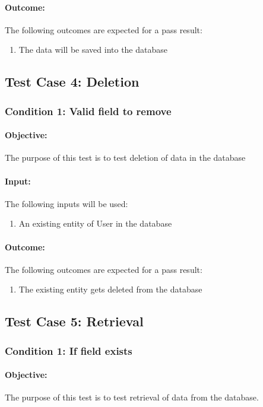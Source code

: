 \documentclass{article}
\begin{document}
\paragraph{Outcome:} The following outcomes are expected for a pass result:
\begin{enumerate}
	\item The data will be saved into the database
\end{enumerate}

\subsection{Test Case 4: Deletion}\label{test4}
\subsubsection{Condition 1: Valid field to remove }
\paragraph{Objective:} The purpose of this test is to test deletion of data in the database
\paragraph{Input:} The following inputs will be used:
\begin{enumerate}
	\item An existing entity of User in the database
\end{enumerate}
\paragraph{Outcome:} The following outcomes are expected for a pass result:
\begin{enumerate}
	\item The existing entity gets deleted from the database 
\end{enumerate}

\subsection{Test Case 5: Retrieval}\label{test5}
\subsubsection{Condition 1: If field exists }
\paragraph{Objective:} The purpose of this test is to test retrieval of data from the database.
\end{document}
